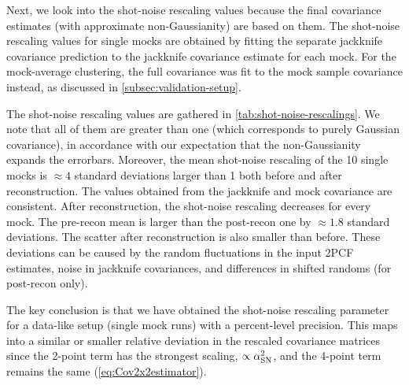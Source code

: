 Next, we look into the shot-noise rescaling values because the final covariance estimates (with approximate non-Gaussianity) are based on them.
The shot-noise rescaling values for single mocks are obtained by fitting the separate \rascalc{} jackknife covariance prediction to the jackknife covariance estimate for each mock.
For the mock-average clustering, the full \rascalc{} covariance was fit to the mock sample covariance instead, as discussed in \cref{subsec:validation-setup}.

The shot-noise rescaling values are gathered in \cref{tab:shot-noise-rescalings}.
We note that all of them are greater than one (which corresponds to purely Gaussian covariance), in accordance with our expectation that the non-Gaussianity expands the errorbars.
Moreover, the mean shot-noise rescaling of the 10 single mocks is $\approx 4$ standard deviations larger than 1 both before and after reconstruction.
The values obtained from the jackknife and mock covariance are consistent.
After reconstruction, the shot-noise rescaling decreases for every mock.
The pre-recon mean is larger than the post-recon one by $\approx 1.8$ standard deviations.
The scatter after reconstruction is also smaller than before.
These deviations can be caused by the random fluctuations in the input 2PCF estimates, noise in jackknife covariances, and differences in shifted randoms (for post-recon only).

The key conclusion is that we have obtained the shot-noise rescaling parameter for a data-like setup (single mock runs) with a percent-level precision.
This maps into a similar or smaller relative deviation in the rescaled covariance matrices since the 2-point term has the strongest scaling, $\propto \alpha_{\rm SN}^2$, and the 4-point term remains the same (\cref{eq:Cov2x2estimator}).

